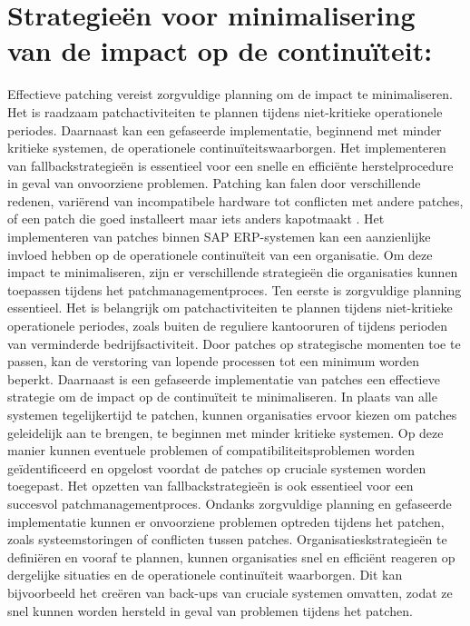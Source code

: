 \section{Strategieën voor minimalisering van de impact op de continuïteit:}
Effectieve patching vereist zorgvuldige planning om de impact te minimaliseren. Het is raadzaam patchactiviteiten te plannen tijdens niet-kritieke operationele periodes. Daarnaast kan een gefaseerde implementatie, beginnend met minder kritieke systemen, de operationele continuïteitswaarborgen. Het implementeren van fallbackstrategieën is essentieel voor een snelle en efficiënte herstelprocedure in geval van onvoorziene problemen. Patching kan falen door verschillende redenen, variërend van incompatibele hardware tot conflicten met andere patches, of een patch die goed installeert maar iets anders kapotmaakt \autocite{Shein2022}.
Het implementeren van patches binnen SAP ERP-systemen kan een aanzienlijke invloed hebben op de operationele continuïteit van een organisatie. Om deze impact te minimaliseren, zijn er verschillende strategieën die organisaties kunnen toepassen tijdens het patchmanagementproces.
Ten eerste is zorgvuldige planning essentieel. Het is belangrijk om patchactiviteiten te plannen tijdens niet-kritieke operationele periodes, zoals buiten de reguliere kantooruren of tijdens perioden van verminderde bedrijfsactiviteit. Door patches op strategische momenten toe te passen, kan de verstoring van lopende processen tot een minimum worden beperkt.
Daarnaast is een gefaseerde implementatie van patches een effectieve strategie om de impact op de continuïteit te minimaliseren. In plaats van alle systemen tegelijkertijd te patchen, kunnen organisaties ervoor kiezen om patches geleidelijk aan te brengen, te beginnen met minder kritieke systemen. Op deze manier kunnen eventuele problemen of compatibiliteitsproblemen worden geïdentificeerd en opgelost voordat de patches op cruciale systemen worden toegepast.
Het opzetten van fallbackstrategieën is ook essentieel voor een succesvol patchmanagementproces. Ondanks zorgvuldige planning en gefaseerde implementatie kunnen er onvoorziene problemen optreden tijdens het patchen, zoals systeemstoringen of conflicten tussen patches. Organisatieskstrategieën te definiëren en vooraf te plannen, kunnen organisaties snel en efficiënt reageren op dergelijke situaties en de operationele continuïteit waarborgen. Dit kan bijvoorbeeld het creëren van back-ups van cruciale systemen omvatten, zodat ze snel kunnen worden hersteld in geval van problemen tijdens het patchen.

